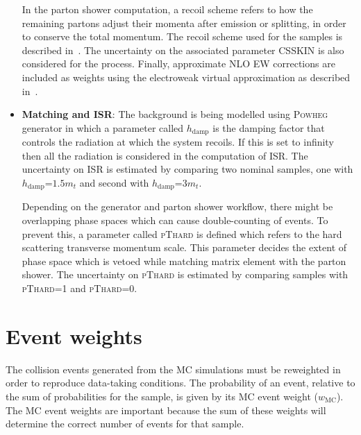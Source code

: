 \begin{itemize}
  In the parton shower computation, a recoil scheme refers to how the remaining partons adjust their
  momenta after emission or splitting, in order to conserve the total momentum. The recoil scheme used
  for the \diboson samples is described in~\cite{Schumann:2007mg}. The uncertainty on the associated parameter CSSKIN is 
  also considered for the \diboson process. Finally, approximate NLO EW corrections are included as weights using
  the electroweak virtual approximation as described in~\cite{Kallweit:2014xda}. 

  \item \textbf{Matching and ISR}: The \ttbar background is being modelled using \textsc{Powheg}
  generator in which a parameter called $h_{\text{damp}}$ is the damping factor that controls the radiation
  at which the \ttbar system recoils. If this is set to infinity then all the radiation is considered
  in the computation of ISR. The uncertainty on ISR is estimated by comparing two nominal \ttbar 
  samples, one with $h_{\text{damp}}$=$1.5m_t$ and second with $h_{\text{damp}}$=$3m_t$.

  Depending on the generator and parton shower workflow, there might be overlapping phase spaces
  which can cause double-counting of events. To prevent this, a parameter called \textsc{pThard} is defined 
  which refers to the hard scattering transverse momentum scale. This parameter decides the extent of 
  phase space which is vetoed while matching matrix element with the parton shower. 
  The uncertainty on \textsc{pThard} is estimated
  by comparing samples with \textsc{pThard}=1 and \textsc{pThard}=0.
\end{itemize}
\label{sec:systdescribe2}

\section{Event weights}

The collision events generated from the MC simulations must be reweighted in order to reproduce
data-taking conditions. The probability of
an event, relative to the sum of probabilities for the sample, is given by its MC event weight ($w_{\text{MC}}$).
The MC event weights are important because the sum of these weights will determine the 
correct number of events for that sample. 


